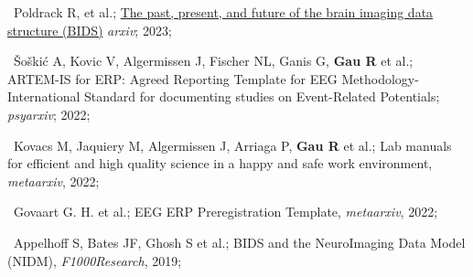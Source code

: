 \textbullet~Poldrack R, et al.;
\href{https://arxiv.org/abs/2309.05768v1}{The past, present, and future of the brain imaging data structure (BIDS)}
\textit{arxiv};
2023;
\newline
{}


\textbullet~Šoškić A, Kovic V, Algermissen J, Fischer NL, Ganis G, \textbf{Gau R} et al.;
{ARTEM-IS for ERP: Agreed Reporting Template for EEG Methodology-International Standard for documenting studies on Event-Related Potentials};
\textit{psyarxiv};
2022;
\newline
{}


\textbullet~Kovacs M, Jaquiery M, Algermissen J, Arriaga P, \textbf{Gau R} et al.;
Lab manuals for efficient and high quality science in a happy and safe work environment,
\textit{metaarxiv},
2022;
\newline
{}


\textbullet~Govaart G. H. et al.;
EEG ERP Preregistration Template,
\textit{metaarxiv},
2022;
\newline
{}


\textbullet~Appelhoff S, Bates JF, Ghosh S et al.;
BIDS and the NeuroImaging Data Model (NIDM),
\textit{F1000Research},
2019;
